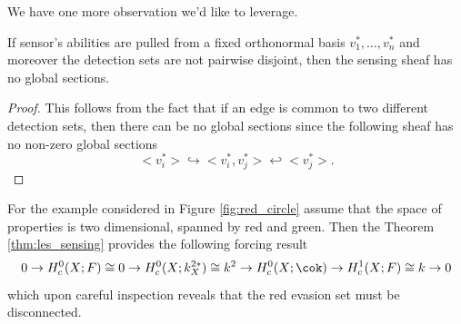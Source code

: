 We have one more observation we'd like to leverage.

\begin{clm}\label{clm:no_sections}
	If sensor's abilities are pulled from a fixed orthonormal basis $v_1^*,\ldots, v_n^*$ and moreover the detection sets are not pairwise disjoint, then the sensing sheaf has no global sections.
\end{clm}
\begin{proof}
	This follows from the fact that if an edge is common to two different detection sets, then there can be no global sections since the following sheaf has no non-zero global sections
	\[
		<v_i^*> \hookrightarrow <v_i^*,v^*_j> \hookleftarrow <v_j^*>.
	\]
\end{proof}

For the example considered in Figure \ref{fig:red_circle} assume that the space of properties is two dimensional, spanned by red and green. Then the Theorem \ref{thm:les_sensing} provides the following forcing result
\[
 0 \to H^0_c(X;F)\cong 0 \to H^0_c(X;k^{2*}_X)\cong k^2 \to H^0_c(X;\cok) \to H^1_c(X;F)\cong k \to 0 
\]
which upon careful inspection reveals that the red evasion set must be disconnected.

